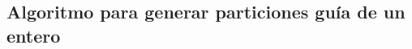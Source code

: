
  \subsection{Algoritmo para generar particiones guía de un
  entero}\label{secc:algo_particiones_validas}

